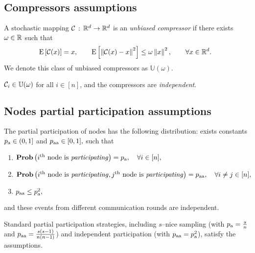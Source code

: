 \documentclass{article}
\newcommand*{\probavailable}{\ensuremath{p_{\textnormal{a}}}}
\newcommand*{\probpairaa}{\ensuremath{p_{\textnormal{aa}}}}
\begin{document}
\subsection{Compressors assumptions}
\begin{definition}
    A stochastic mapping $\mathcal{C}\,:\,\mathbb{R}^d \rightarrow \mathbb{R}^d$ is an \textit{unbiased compressor} if
    there exists $\omega \in \mathbb{R}$ such that
    \begin{align}
        \label{eq:compressor}
        \hspace{-0.2cm}\Exp{\cC(x)} = x, \qquad \Exp{\norm{\cC(x) - x}^2} \leq \omega \norm{x}^2, \qquad \forall x \in \R^d.
    \end{align}
    We denote this class of unbiased compressors  as $\mathbb{U}(\omega).$
\end{definition}
\begin{assumption}
\label{ass:compressors}
 $\mathcal{C}_i \in \mathbb{U}(\omega)$ for all $i\in [n]$, and the compressors are  \textit{independent}.
\end{assumption}

\subsection{Nodes partial participation assumptions}
\label{sec:partial_participation}
\begin{assumption}
  The partial participation of nodes has the following distribution: exists constants $\probavailable \in (0, 1]$ and $\probpairaa \in [0, 1],$ such that
  \begin{enumerate}
    \item $\Prob\left(i^{\textnormal{th}} \textnormal{ node is \textit{participating}}\right) = \probavailable, \quad \forall i \in [n],$
    \item $\Prob\left(i^{\textnormal{th}} \textnormal{ node is \textit{participating}}, j^{\textnormal{th}} \textnormal{ node is \textit{participating}}\right) = \probpairaa, \quad \forall i \neq j \in [n],$
    \item $\probpairaa \leq \probavailable^2,$
  \end{enumerate}
  and these events from different communication rounds are independent.
\end{assumption}
Standard partial participation strategies, including $s$--nice sampling (with $\probavailable = \frac{s}{n}$ and $\probpairaa = \frac{s(s-1)}{n(n-1)}$) and independent participation (with $\probpairaa = \probavailable^2$), satisfy the assumptions.
\end{document}
